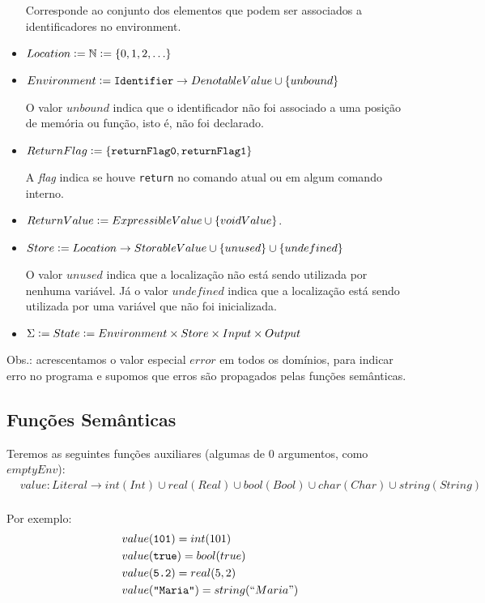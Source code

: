 \documentclass[12pt]{article}
\newcommand{\defeq}{\vcentcolon=}
\begin{document}
\begin{itemize}
Corresponde ao conjunto dos elementos que podem ser associados a identificadores no environment.

\item $Location \defeq \mathbb{N} \defeq \{0, 1, 2, \ldots\}$
\item $Environment \defeq {\tt Identifier} \to DenotableValue \cup \{unbound\}$

O valor $unbound$ indica que o identificador não foi associado a uma posição de memória ou função, isto é, não foi declarado.

\item $ReturnFlag \defeq {\tt \{returnFlag0, returnFlag1\}}$

A {\it flag} indica se houve {\tt return} no comando atual ou em algum comando interno.

\item $ReturnValue \defeq ExpressibleValue\cup \{voidValue\}$.

\item $Store \defeq Location\to StorableValue \cup \{unused\} \cup \{undefined\}$

O valor $unused$ indica que a localização não está sendo utilizada por nenhuma variável. Já o valor $undefined$ indica que a localização está sendo utilizada por uma variável que não foi inicializada.


\item $\Sigma \defeq State \defeq Environment \times Store \times Input \times Output$


\end{itemize}

Obs.: acrescentamos o valor especial $error$ em todos os domínios, para indicar erro no programa e supomos que erros são propagados pelas funções semânticas.

\subsection{Funções Semânticas}
Teremos as seguintes funções auxiliares (algumas de $0$ argumentos, como $emptyEnv$):
\begin{align*}
&value:Literal\to int(Int)\cup real(Real)\cup bool(Bool)\cup  char(Char)\cup string(String) \\
\end{align*}

Por exemplo:
\begin{align*}
&value(\text{{\tt 101}}) = int(101) \\
&value(\text{{\tt true}}) = bool(true) \\
&value(\text{{\tt 5.2}}) = real(5,2) \\
&value(\text{{\tt "Maria"}}) = string(``Maria") \\
\end{align*}
\end{document}
